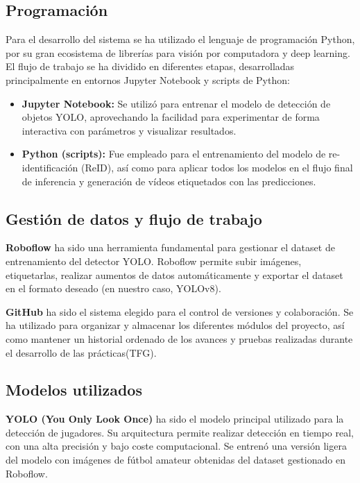 \documentclass[12pt, a4paper, twoside]{article}
\begin{document}
	\subsection{Programación}
	
	Para el desarrollo del sistema se ha utilizado el lenguaje de programación Python, por su gran ecosistema de librerías para visión por computadora y deep learning. El flujo de trabajo se ha dividido en diferentes etapas, desarrolladas principalmente en entornos Jupyter Notebook y scripts de Python:
	
	\begin{itemize}
		\item \textbf{Jupyter Notebook:} Se utilizó para entrenar el modelo de detección de objetos YOLO, aprovechando la facilidad para experimentar de forma interactiva con parámetros y visualizar resultados.
		\item \textbf{Python (scripts):} Fue empleado para el entrenamiento del modelo de re-identificación (ReID), así como para aplicar todos los modelos en el flujo final de inferencia y generación de vídeos etiquetados con las predicciones.
	\end{itemize}
	
	\subsection{Gestión de datos y flujo de trabajo}
	
	\textbf{Roboflow} ha sido una herramienta fundamental para gestionar el dataset de entrenamiento del detector YOLO. Roboflow permite subir imágenes, etiquetarlas, realizar aumentos de datos automáticamente y exportar el dataset en el formato deseado (en nuestro caso, YOLOv8).
	
	\textbf{GitHub} ha sido el sistema elegido para el control de versiones y colaboración. Se ha utilizado para organizar y almacenar los diferentes módulos del proyecto, así como mantener un historial ordenado de los avances y pruebas realizadas durante el desarrollo de las prácticas(TFG).
	
	\subsection{Modelos utilizados}
	
	\textbf{YOLO (You Only Look Once)} ha sido el modelo principal utilizado para la detección de jugadores. Su arquitectura permite realizar detección en tiempo real, con una alta precisión y bajo coste computacional. Se entrenó una versión ligera del modelo con imágenes de fútbol amateur obtenidas del dataset gestionado en Roboflow.
	
\end{document}

